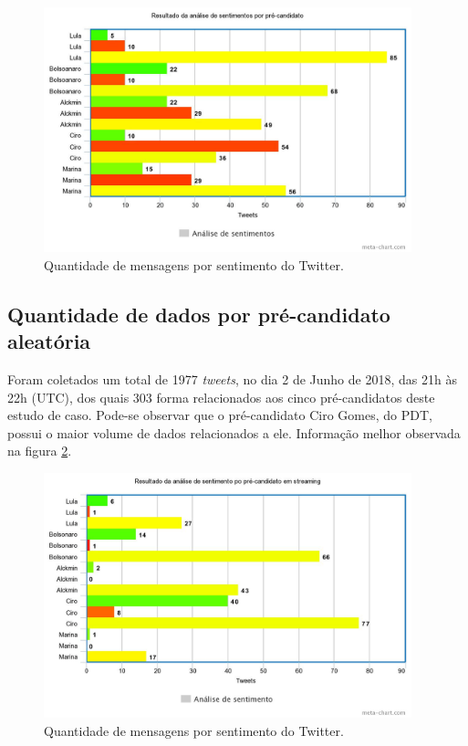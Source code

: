     \begin{figure}[h]
        \centering
        \includegraphics[width=0.95\textwidth]{imagens/resultadoSentimentoTwitter.jpeg}
        \caption {Quantidade de mensagens por sentimento do Twitter.}
        \label{fig:resultadoSentimentoTwitter}
    \end{figure}

\subsection{Quantidade de dados por pré-candidato aleatória}

Foram coletados um total de 1977 \textit{tweets}, no dia  2 de Junho de 2018, das 21h às 22h (UTC), dos quais 303 forma relacionados aos cinco pré-candidatos deste estudo de caso. Pode-se observar que o pré-candidato Ciro Gomes, do PDT, possui o maior volume de dados relacionados a ele. Informação melhor observada na figura \ref{fig:resultSentimentoStreaming}.
    
    \begin{figure}[h]
        \centering
        \includegraphics[width=0.95\textwidth]{imagens/resultSentimentoStreaming.jpeg}
        \caption {Quantidade de mensagens por sentimento do Twitter.}
        \label{fig:resultSentimentoStreaming}
    \end{figure}


